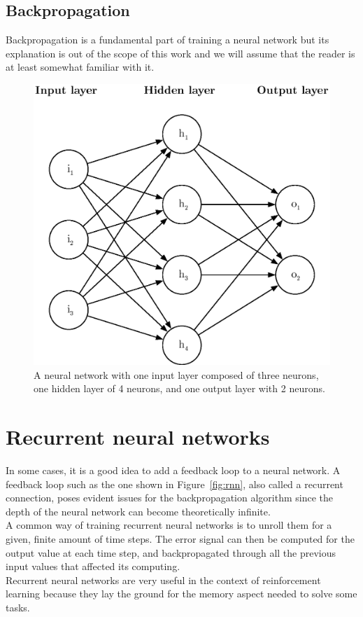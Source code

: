 \subsection{Backpropagation}
Backpropagation is a fundamental part of training a neural network but its
explanation is out of the scope of this work and we will assume that the
reader is at least somewhat familiar with it.

\begin{figure}[]
	\centering
	\includegraphics[width=0.6\linewidth]{fig/neural_network.eps}
	\caption{A neural network with one input layer composed of three neurons,
	one hidden layer of 4 neurons, and one output layer with 2 neurons.}
	\label{fig:neural_network}
\end{figure}


\section{Recurrent neural networks}
In some cases, it is a good idea to add a feedback loop to a neural network. 
A feedback loop such as the one shown in Figure~\ref{fig:rnn}, also called
a recurrent connection, poses evident issues for the backpropagation algorithm
since the depth of the neural network can become theoretically infinite.\\

A common way of training recurrent neural networks is to unroll them for a 
given, finite amount of time steps. The error signal can then be computed
for the output value at each time step, and backpropagated through all the
previous input values that affected its computing.\\

Recurrent neural networks are very useful in the context of reinforcement 
learning because they lay the ground for the memory aspect needed to solve
some tasks.

